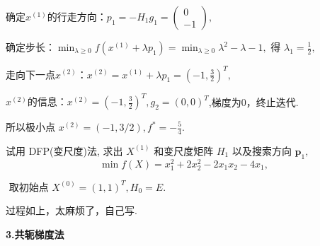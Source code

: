 \documentclass[cn]{elegantbook}
\begin{document}
\begin{solution}
 \textcolor[rgb]{0.00,0.50,1.00}{\large 确定$x^{(1)}$的行走方向：}$ p_{1}=-H_{1} g_{1}=\left(\begin{array}{c}
0 \\
-1
\end{array}\right),$
\vspace{5pt}

 \textcolor[rgb]{0.00,0.50,1.00}{\large 确定步长：}$\displaystyle\min_{\lambda\geq 0} f(x^{(1)}+\lambda p_{1})=\min_{\lambda\geq 0}\lambda^{2}-\lambda-1,
 \text { 得 } \lambda_{1}=\frac{1}{2},$
 \vspace{5pt}

   \textcolor[rgb]{0.00,0.50,1.00}{\large 走向下一点$x^{(2)}$：}$x^{(2)}=x^{(1)}+\lambda p_{1}=\left(-1, \frac{3}{2}\right)^{T},$
  \vspace{30pt}

  \textcolor[rgb]{1.00,0.00,0.00}{\large $x^{(2)}$的信息：}$x^{(2)}=\left(-1, \frac{3}{2}\right)^{T},g_{2}=(0,0)^{T}$,梯度为0，终止迭代.
  \vspace{5pt}

  所以极小点 $ x^{(2)}=(-1,3 / 2), f^{*}=-\frac{5}{4}.$

\end{solution}

\begin{exercisez}
 试用 DFP(变尺度)法, 求出 $ X^{(1)} $ 和变尺度矩阵 $ H_{1}$  以及搜索方向  $\boldsymbol{p}_{1} ,$
$$
\min f(X)=x_{1}^{2}+2 x_{2}^{2}-2 x_{1} x_{2}-4 x_{1},$$

$ \text { 取初始点 } X^{(0)}=(1,1)^{T}, H_{0}=E \text {. }
$
\end{exercisez}
\begin{solution}
过程如上，太麻烦了，自己写.
\end{solution}





\newpage
\begin{center}
 \textcolor[rgb]{0.33,0.33,1.00}{\huge \bf{3.共轭梯度法}}
\end{center}
\end{document}
